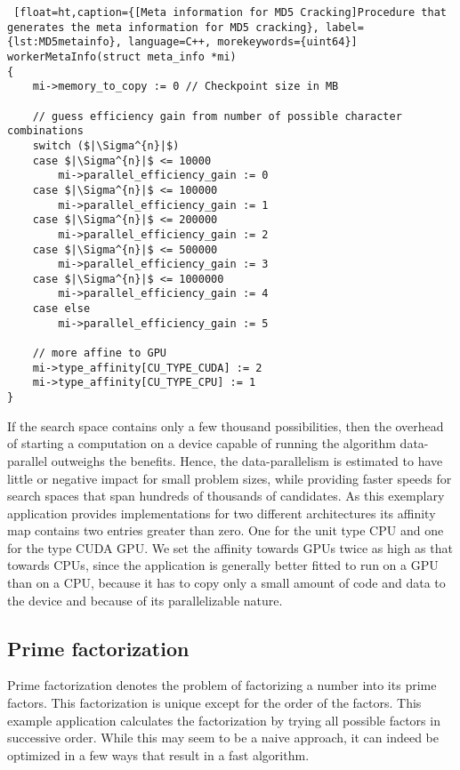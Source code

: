 \begin{lstlisting} [float=ht,caption={[Meta information for MD5 Cracking]Procedure that generates the meta information for MD5 cracking}, label={lst:MD5metainfo}, language=C++, morekeywords={uint64}]
workerMetaInfo(struct meta_info *mi)
{
	mi->memory_to_copy := 0 // Checkpoint size in MB
	
	// guess efficiency gain from number of possible character combinations
	switch ($|\Sigma^{n}|$)
	case $|\Sigma^{n}|$ <= 10000
		mi->parallel_efficiency_gain := 0
	case $|\Sigma^{n}|$ <= 100000
		mi->parallel_efficiency_gain := 1
	case $|\Sigma^{n}|$ <= 200000
		mi->parallel_efficiency_gain := 2
	case $|\Sigma^{n}|$ <= 500000
		mi->parallel_efficiency_gain := 3
	case $|\Sigma^{n}|$ <= 1000000
		mi->parallel_efficiency_gain := 4
	case else
		mi->parallel_efficiency_gain := 5
	
	// more affine to GPU
	mi->type_affinity[CU_TYPE_CUDA] := 2
	mi->type_affinity[CU_TYPE_CPU] := 1
}
\end{lstlisting} 

If the search space contains only a few thousand possibilities, then the overhead of starting a computation on a device capable of running the algorithm data-parallel outweighs the benefits. Hence, the data-parallelism is estimated to have little or negative impact for small problem sizes, while providing faster speeds for search spaces that span hundreds of thousands of candidates. As this exemplary application provides implementations for two different architectures its affinity map contains two entries greater than zero. One for the unit type CPU and one for the type CUDA GPU. We set the affinity towards GPUs twice as high as that towards CPUs, since the application is generally better fitted to run on a GPU than on a CPU, because it has to copy only a small amount of code and data to the device and because of its parallelizable nature.

\subsection{Prime factorization}
	\label{Implementation:Userside:PF}

Prime factorization denotes the problem of factorizing a number into its prime factors. This factorization is unique except for the order of the factors. This example application calculates the factorization by trying all possible factors in successive order. While this may seem to be a naive approach, it can indeed be optimized in a few ways that result in a fast algorithm.

